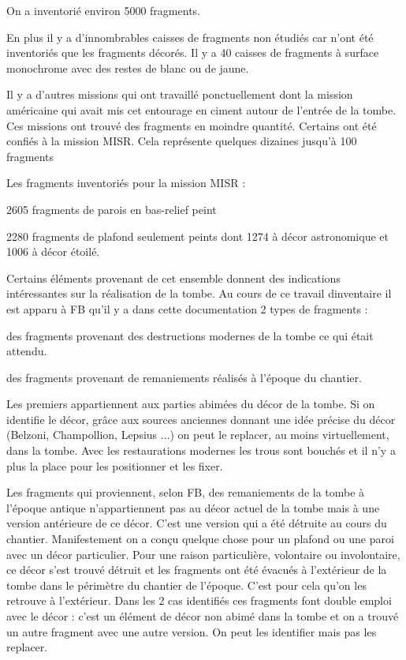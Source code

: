 \documentclass{article}
\begin{document}
On a inventorié environ 5000 fragments. 

En plus il y a d’innombrables caisses de fragments non étudiés car n’ont
été inventoriés que les fragments décorés. Il y a 40 caisses de
fragments à surface monochrome avec des restes de blanc ou de jaune.

Il y a d’autres missions qui ont travaillé ponctuellement dont la
mission américaine qui avait mis cet entourage en ciment autour de
l’entrée de la tombe. Ces missions ont trouvé des fragments en moindre
quantité. Certains ont été confiés à la mission MISR. Cela représente
quelques dizaines jusqu’à 100 fragments

Les fragments inventoriés pour la mission MISR :

2605 fragments de parois en bas-relief peint

2280 fragments de plafond seulement peints dont 1274 à décor
astronomique et 1006 à décor étoilé.

Certains éléments provenant de cet ensemble donnent des indications
intéressantes sur la réalisation de la tombe. Au cours de ce travail
d{\textquotesingle}inventaire il est apparu à FB qu’il y a dans cette
documentation 2 types de fragments : 

 des fragments provenant des destructions modernes de la tombe ce qui
était attendu.

 des fragments provenant de remaniements réalisés à l’époque du
chantier.

Les premiers appartiennent aux parties abimées du décor de la tombe. Si
on identifie le décor, grâce aux sources anciennes donnant une idée
précise du décor (Belzoni, Champollion, Lepsius ...) on peut le
replacer, au moins virtuellement, dans la tombe. Avec les restaurations
modernes les trous sont bouchés et il n’y a plus la place pour les
positionner et les fixer. 

Les fragments qui proviennent, selon FB, des remaniements de la tombe à
l’époque antique n’appartiennent pas au décor actuel de la tombe mais à
une version antérieure de ce décor. C’est une version qui a été
détruite au cours du chantier. Manifestement on a conçu quelque chose
pour un plafond ou une paroi avec un décor particulier. Pour une raison
particulière, volontaire ou involontaire, ce décor s’est trouvé détruit
et les fragments ont été évacués à l’extérieur de la tombe dans le
périmètre du chantier de l’époque.  C’est pour cela qu’on les  retrouve
à l’extérieur. Dans les 2 cas identifiés ces fragments font double
emploi avec le décor : c’est un élément de décor non abimé dans la
tombe et on a trouvé un autre fragment avec une autre version. On peut
les identifier mais pas les replacer. 
\end{document}

